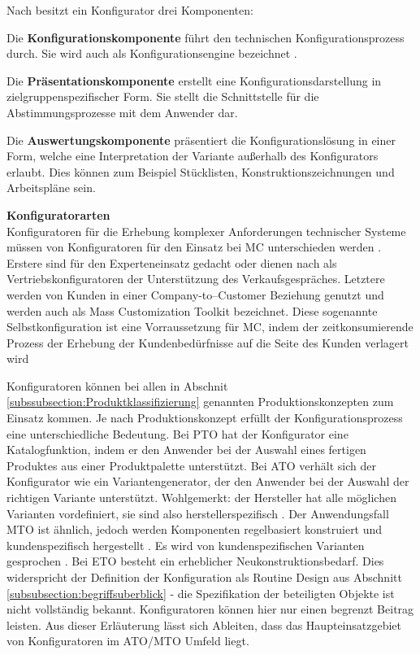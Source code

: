 \documentclass[12pt,a4paper,bibliography=totocnumbered,listof=totoc]{scrartcl}
\begin{document}
Nach \citet{piller06} besitzt ein Konfigurator drei Komponenten:
\begin{compactitem}
\item Die \textbf{Konfigurationskomponente} führt den technischen Konfigurationsprozess durch. Sie wird auch als Konfigurationsengine bezeichnet \citep{tactonProductOverview}.
\item Die \textbf{Präsentationskomponente} erstellt eine Konfigurationsdarstellung in zielgruppenspezifischer Form. Sie stellt die Schnittstelle für die Abstimmungsprozesse mit dem Anwender dar.
\item Die \textbf{Auswertungskomponente} präsentiert die Konfigurationslösung in einer Form, welche eine Interpretation der Variante außerhalb des Konfigurators erlaubt. Dies können zum Beispiel Stücklisten, Konstruktionszeichnungen und Arbeitspläne sein.
\end{compactitem}

\textbf{Konfiguratorarten}\\
Konfiguratoren für die Erhebung komplexer Anforderungen technischer Systeme  müssen von Konfiguratoren für den Einsatz bei \ac{MC} unterschieden werden \citep{felferning14}. Erstere sind für den Experteneinsatz gedacht oder dienen nach \citet{piller06} als Vertriebskonfiguratoren der Unterstützung des Verkaufsgespräches.   Letztere werden von Kunden in einer Company-to–Customer Beziehung genutzt und werden auch als Mass Customization Toolkit bezeichnet. Diese sogenannte Selbstkonfiguration ist eine Vorraussetzung für \ac{MC}, indem der zeitkonsumierende Prozess der Erhebung der Kundenbedürfnisse auf die Seite des Kunden verlagert wird \citep{piller06}

Konfiguratoren können bei allen in Abschnit \ref{subssubsection:Produktklassifizierung} genannten Produktionskonzepten zum Einsatz kommen. Je nach Produktionskonzept erfüllt der Konfigurationsprozess eine unterschiedliche Bedeutung. Bei \ac{PTO} hat der Konfigurator eine Katalogfunktion, indem er den Anwender bei der Auswahl eines fertigen Produktes aus einer Produktpalette unterstützt. Bei \ac{ATO} verhält sich der Konfigurator wie ein Variantengenerator, der den Anwender bei der Auswahl der richtigen Variante unterstützt. Wohlgemerkt: der Hersteller hat alle möglichen Varianten vordefiniert, sie sind also herstellerspezifisch \citep{schomburg80}. Der Anwendungsfall \ac{MTO} ist ähnlich, jedoch werden Komponenten regelbasiert konstruiert und kundenspezifisch hergestellt . Es wird von kundenspezifischen Varianten gesprochen \citep{schomburg80}. Bei \ac{ETO} besteht ein erheblicher Neukonstruktionsbedarf. Dies widerspricht der Definition der Konfiguration als Routine Design aus Abschnitt \ref{subsubsection:begriffsuberblick} - die Spezifikation der beteiligten Objekte ist nicht vollständig bekannt. Konfiguratoren können hier nur einen begrenzt Beitrag leisten. Aus dieser Erläuterung lässt sich Ableiten, dass das Haupteinsatzgebiet von Konfiguratoren im \ac{ATO}/\ac{MTO} Umfeld liegt.
\end{document}
